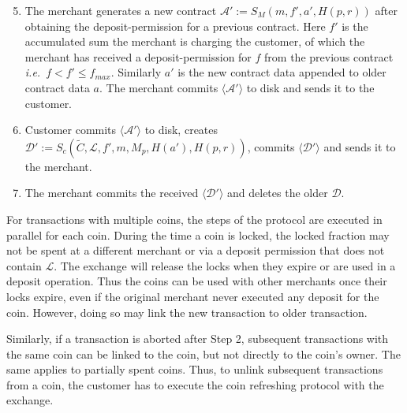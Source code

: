 \documentclass{llncs}
\begin{document}
\begin{enumerate}
  \setcounter{enumi}{4}
\item The merchant generates a new contract $ \mathcal{A}' := S_M(m, f', a', H(p,
  r)) $ after obtaining the deposit-permission for a previous contract.  Here
  $f'$ is the accumulated sum the merchant is charging the customer, of which
  the merchant has received a deposit-permission for $f$ from the previous
  contract \textit{i.e.}~$f <f' \leq f_{max}$.  Similarly $a'$ is the new
  contract data appended to older contract data $a$.
  The merchant commits $\langle \mathcal{A}' \rangle$ to disk and sends it to the customer.
\item Customer commits $\langle \mathcal{A}' \rangle$ to disk, creates
  $\mathcal{D}' := S_c(\widetilde{C}, \mathcal{L}, f', m, M_p, H(a'), H(p, r))$, commits
  $\langle \mathcal{D'} \rangle$ and sends it to the merchant.
\item The merchant commits the received $\langle \mathcal{D'} \rangle$ and
  deletes the older $\mathcal{D}$.
\end{enumerate}


For transactions with multiple coins, the steps of the protocol are
executed in parallel for each coin.  During the time a coin is locked,
the locked fraction may not be spent at a different merchant or via a
deposit permission that does not contain $\mathcal{L}$.  The exchange will
release the locks when they expire or are used in a deposit operation.
Thus the coins can be used with other merchants once their locks
expire, even if the original merchant never executed any deposit for
the coin.  However, doing so may link the new transaction to older
transaction.

Similarly, if a transaction is aborted after Step 2, subsequent
transactions with the same coin can be linked to the coin, but not
directly to the coin's owner.  The same applies to partially spent
coins.  Thus, to unlink subsequent transactions from a coin, the
customer has to execute the coin refreshing protocol with the exchange.
\end{document}
